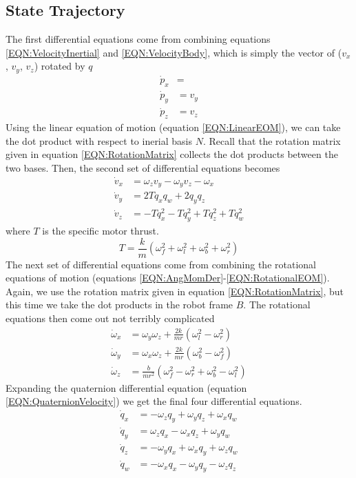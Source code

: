 \documentclass[lettersize,journal]{IEEEtran}
\begin{document}
\subsection{State Trajectory}
The first differential equations come from combining equations \ref{EQN:VelocityInertial} and \ref{EQN:VelocityBody}, which is simply the vector of ($v_x$, $v_y$, $v_z$) rotated by $q$
\begin{align}
  \dot{p}_x &= \\
  \dot{p}_y &= v_y \\
  \dot{p}_z &= v_z \label{EQN:VelocityZ}
\end{align}
Using the linear equation of motion (equation \ref{EQN:LinearEOM}), we can take the dot product with respect to inerial basis $N$.
Recall that the rotation matrix given in equation \ref{EQN:RotationMatrix} collects the dot products between the two bases.
Then, the second set of differential equations becomes
\begin{align}
  \dot{v}_x &= \omega_zv_y-\omega_yv_z-\omega_x \\
  \dot{v}_y &= 2Tq_xq_w+2q_yq_z \\
  \dot{v}_z &= -Tq_x^2-Tq_y^2+Tq_z^2+Tq_w^2
\end{align}
where $T$ is the specific motor thrust.
\begin{equation}
  T = \frac{k}{m}\left(\omega_f^2 + \omega_l^2 + \omega_b^2 + \omega_r^2\right)
\end{equation}
The next set of differential equations come from combining the rotational equations of motion (equations \ref{EQN:AngMomDer}-\ref{EQN:RotationalEOM}).
Again, we use the rotation matrix given in equation \ref{EQN:RotationMatrix}, but this time we take the dot products in the robot frame $B$.
The rotational equations then come out not terribly complicated
\begin{align}
  \dot{\omega}_x &= \omega_y\omega_z+\frac{2k}{mr}\left(\omega_l^2-\omega_r^2\right) \\
  \dot{\omega}_y &= \omega_x\omega_z+\frac{2k}{mr}\left(\omega_b^2-\omega_f^2\right) \\
  \dot{\omega}_z &= \frac{b}{mr^2}\left(\omega_f^2-\omega_r^2+\omega_b^2-\omega_l^2\right)
\end{align}
Expanding the quaternion differential equation (equation  \ref{EQN:QuaternionVelocity}) we get the final four differential equations.
\begin{align}
  \dot{q}_x &= -\omega_z q_y + \omega_y q_z + \omega_x q_w \\
  \dot{q}_y &= \omega_z q_x - \omega_x q_z + \omega_y q_w  \\
  \dot{q}_z &= -\omega_y q_x + \omega_x q_y + \omega_z q_w \\
  \dot{q}_w &=- \omega_x q_x - \omega_y q_y - \omega_z q_z
\end{align}
\end{document}
